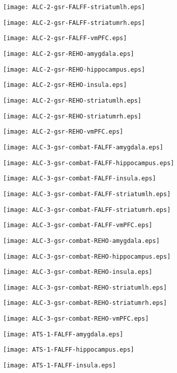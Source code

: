 \documentclass{article}
\begin{document}
\newpage
\texttt{[image: ALC-2-gsr-FALFF-striatumlh.eps]}

\newpage
\texttt{[image: ALC-2-gsr-FALFF-striatumrh.eps]}

\newpage
\texttt{[image: ALC-2-gsr-FALFF-vmPFC.eps]}

\newpage
\texttt{[image: ALC-2-gsr-REHO-amygdala.eps]}

\newpage
\texttt{[image: ALC-2-gsr-REHO-hippocampus.eps]}

\newpage
\texttt{[image: ALC-2-gsr-REHO-insula.eps]}

\newpage
\texttt{[image: ALC-2-gsr-REHO-striatumlh.eps]}

\newpage
\texttt{[image: ALC-2-gsr-REHO-striatumrh.eps]}

\newpage
\texttt{[image: ALC-2-gsr-REHO-vmPFC.eps]}

\newpage
\texttt{[image: ALC-3-gsr-combat-FALFF-amygdala.eps]}

\newpage
\texttt{[image: ALC-3-gsr-combat-FALFF-hippocampus.eps]}

\newpage
\texttt{[image: ALC-3-gsr-combat-FALFF-insula.eps]}

\newpage
\texttt{[image: ALC-3-gsr-combat-FALFF-striatumlh.eps]}

\newpage
\texttt{[image: ALC-3-gsr-combat-FALFF-striatumrh.eps]}

\newpage
\texttt{[image: ALC-3-gsr-combat-FALFF-vmPFC.eps]}

\newpage
\texttt{[image: ALC-3-gsr-combat-REHO-amygdala.eps]}

\newpage
\texttt{[image: ALC-3-gsr-combat-REHO-hippocampus.eps]}

\newpage
\texttt{[image: ALC-3-gsr-combat-REHO-insula.eps]}

\newpage
\texttt{[image: ALC-3-gsr-combat-REHO-striatumlh.eps]}

\newpage
\texttt{[image: ALC-3-gsr-combat-REHO-striatumrh.eps]}

\newpage
\texttt{[image: ALC-3-gsr-combat-REHO-vmPFC.eps]}

\newpage
\texttt{[image: ATS-1-FALFF-amygdala.eps]}

\newpage
\texttt{[image: ATS-1-FALFF-hippocampus.eps]}

\newpage
\texttt{[image: ATS-1-FALFF-insula.eps]}
\end{document}
